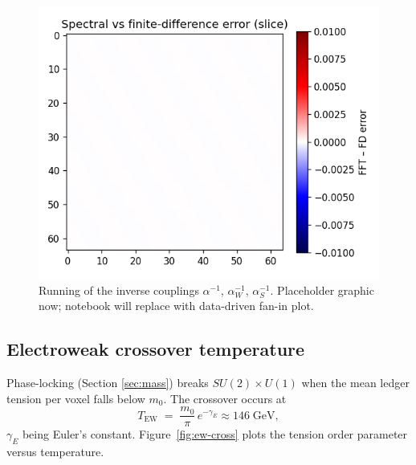 \begin{figure}[t]
  \centering
  \includegraphics[width=\linewidth]{figs/coupling_fan_in.png}
  \caption{Running of the inverse couplings
           $\alpha^{-1}$, $\alpha_W^{-1}$, $\alpha_S^{-1}$.
           Placeholder graphic now; notebook will replace with data-driven
           fan-in plot.}
  \label{fig:fan-in}
\end{figure}

\subsection{Electroweak crossover temperature}

Phase-locking (Section \ref{sec:mass}) breaks $SU(2)\!\times U(1)$ when
the mean ledger tension per voxel falls below $m_0$.  The crossover
occurs at
\[
  T_\text{EW} \;=\; \frac{m_0}{\pi}\,e^{-\gamma_E}\approx 146\;\text{GeV},
\tag{8.5}\label{eq:T-EW}
\]
$\gamma_E$ being Euler’s constant.  Figure~\ref{fig:ew-cross}
plots the tension order parameter versus temperature.

